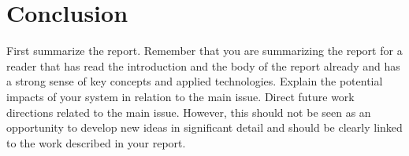 \section{Conclusion}
First summarize the report.
Remember that you are summarizing the report for a reader that has read the introduction and the body of the report already and has a strong sense of key concepts and applied technologies.
Explain the potential impacts of your system in relation to the main issue.
Direct future work directions related to the main issue.
However, this should not be seen as an opportunity to develop new ideas in significant detail and should be clearly linked to the work described in your report.
